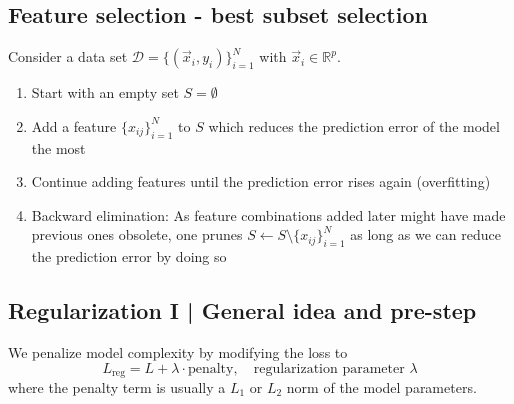 \subsection{Feature selection - best subset selection}
Consider a data set $\mathcal{D} = \{(\vec{x}_i, y_i)\}_{i=1}^N$ with $\vec{x}_i \in \mathbb{R}^p$.

\begin{enumerate}
    \item Start with an empty set $S = \emptyset$
    \item Add a feature $\{ x_{ij} \}_{i=1}^N$ to $S$ which reduces the prediction error of the model the most
    \item Continue adding features until the prediction error rises again (overfitting)
    \item Backward elimination: As feature combinations added later might have made previous ones obsolete,
          one prunes $S \leftarrow S \setminus \{ x_{ij} \}_{i=1}^N$ as long as we can reduce the prediction error by doing so
\end{enumerate}

\subsection{Regularization I | General idea and pre-step}
We penalize model complexity by modifying the loss to
\begin{equation}
    L_{\text{reg}} = L + \lambda \cdot \text{penalty}, \quad \text{regularization parameter } \lambda 
\end{equation}
where the penalty term is usually a $L_1$ or $L_2$ norm of the model parameters.
